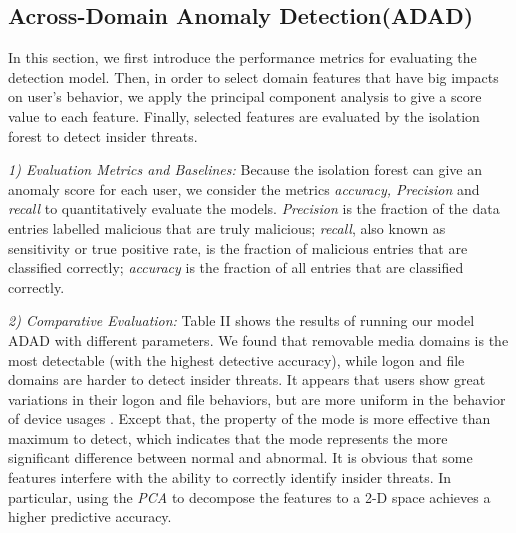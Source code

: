 \documentclass[conference]{IEEEtran}
\begin{document}
\subsection{Across-Domain Anomaly Detection(ADAD)}\label{AA}
In this section, we first introduce the performance metrics for evaluating the detection model. 
Then, in order to select domain features that have big impacts on user's behavior, we apply the principal component analysis to give a score value to each feature. 
Finally, selected features are evaluated by the isolation forest to detect insider threats.


\emph{1) Evaluation Metrics and Baselines:}
Because the isolation forest can give an anomaly score for each user, we consider the metrics \emph{accuracy, Precision} and \emph{recall} to quantitatively evaluate the models.  
\emph{Precision} is the
fraction of the data entries labelled malicious that are
truly malicious; \emph{recall}, also known as sensitivity or true
positive rate, is the fraction of malicious entries that are
classified correctly; \emph{accuracy} is the fraction of all entries
that are classified correctly\cite{b22}.

\emph{2) Comparative Evaluation:} Table II shows the results of running our model ADAD with different parameters.
We found that removable media domains is the most detectable (with the highest detective accuracy), while logon and file domains are harder to detect insider threats. It appears that users show great variations in their logon and file behaviors, but are more uniform in the behavior of device usages . Except that, the property of the mode is more effective than maximum to detect, which indicates that the mode represents the more significant difference between normal and abnormal. It is obvious that some features interfere with the ability to correctly identify insider threats. In particular, using the \emph{PCA} to decompose the features to a 2-D space achieves a higher predictive accuracy.
\end{document}
